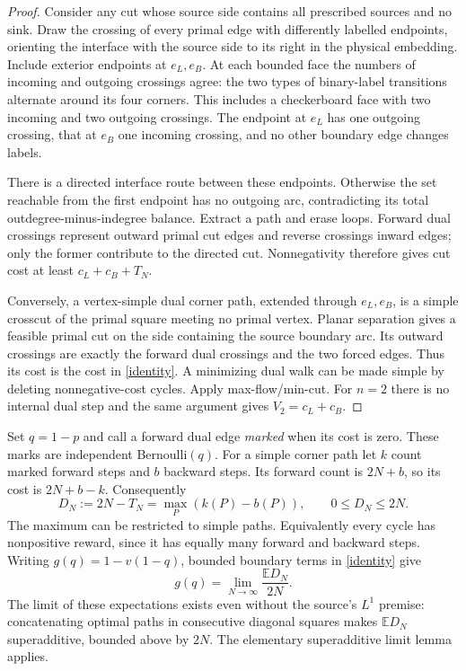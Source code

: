 \documentclass[11pt]{article}
\newcommand{\E}{\mathbb E}
\begin{document}
\begin{proof}
Consider any cut whose source side contains all prescribed sources
and no sink. Draw the crossing of every primal edge with differently
labelled endpoints, orienting the interface with the source side to
its right in the physical embedding. Include exterior endpoints at
$e_L,e_B$. At each bounded face the numbers of incoming and outgoing
crossings agree: the two types of binary-label transitions alternate
around its four corners. This includes a checkerboard face with two
incoming and two outgoing crossings. The endpoint at $e_L$ has one
outgoing crossing, that at $e_B$ one incoming crossing, and no other
boundary edge changes labels.

There is a directed interface route between these endpoints.
Otherwise the set reachable from the first endpoint has no outgoing
arc, contradicting its total outdegree-minus-indegree balance.
Extract a path and erase loops. Forward dual crossings represent
outward primal cut edges and reverse crossings inward edges; only the
former contribute to the directed cut. Nonnegativity therefore gives
cut cost at least $c_L+c_B+T_N$.

Conversely, a vertex-simple dual corner path, extended through
$e_L,e_B$, is a simple crosscut of the primal square meeting no
primal vertex. Planar separation gives a feasible primal cut on the
side containing the source boundary arc. Its outward crossings are
exactly the forward dual crossings and the two forced edges.
Thus its cost is the cost in \eqref{identity}. A minimizing dual walk
can be made simple by deleting nonnegative-cost cycles. Apply
max-flow/min-cut. For $n=2$ there is no internal dual step and the same
argument gives $V_2=c_L+c_B$.
\end{proof}

Set $q=1-p$ and call a forward dual edge \emph{marked} when its cost
is zero. These marks are independent Bernoulli$(q)$. For a simple
corner path let $k$ count marked forward steps and $b$ backward
steps. Its forward count is $2N+b$, so its cost is $2N+b-k$.
Consequently
\begin{equation}\label{defect}
 D_N:=2N-T_N=\max_P(k(P)-b(P)),\qquad 0\le D_N\le2N.
\end{equation}
The maximum can be restricted to simple paths. Equivalently every
cycle has nonpositive reward, since it has equally many forward and
backward steps.
Writing $g(q)=1-v(1-q)$, bounded boundary terms in \eqref{identity}
give
\begin{equation}\label{density}
 g(q)=\lim_{N\to\infty}\frac{\E D_N}{2N}.
\end{equation}
The limit of these expectations exists even without the source's
$L^1$ premise: concatenating optimal paths in consecutive diagonal
squares makes $\E D_N$ superadditive, bounded above by $2N$.
The elementary superadditive limit lemma applies.
\end{document}
